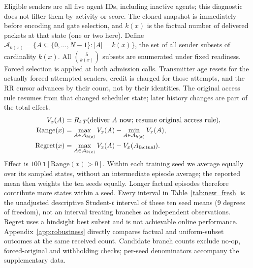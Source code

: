 \documentclass[10pt]{article}
\begin{document}
Eligible senders are all five agent IDs, including inactive agents; this diagnostic does not filter them by activity or score. The cloned snapshot is immediately before encoding and gate selection, and $k(x)$ is the factual number of delivered packets at that state (one or two here). Define $\mathcal A_{k(x)}=\{A\subseteq\{0,\ldots,N-1\}:|A|=k(x)\}$, the set of all sender subsets of cardinality $k(x)$. All $\binom{5}{k(x)}$ subsets are enumerated under fixed readiness. Forced selection is applied at both admission calls. Transmitter age resets for the actually forced attempted senders, credit is charged for those attempts, and the RR cursor advances by their count, not by their identities. The original access rule resumes from that changed scheduler state; later history changes are part of the total effect.
\begin{align}
 V_x(A)&=R_{t:T}(\text{deliver }A\text{ now; resume original access rule}),\\
 \mathrm{Range}(x)&=\max_{A\in\mathcal A_{k(x)}}V_x(A)-\min_{A\in\mathcal A_{k(x)}}V_x(A),\\
 \mathrm{Regret}(x)&=\max_{A\in\mathcal A_{k(x)}}V_x(A)-V_x(A_{\rm factual}).
\end{align}
Effect is $100\,\mathbf1[\mathrm{Range}(x)>0]$. Within each training seed we average equally over its sampled states, without an intermediate episode average; the reported mean then weights the ten seeds equally. Longer factual episodes therefore contribute more states within a seed. Every interval in Table~\ref{tab:new_fresh} is the unadjusted descriptive Student-$t$ interval of these ten seed means (9 degrees of freedom), not an interval treating branches as independent observations. Regret uses a hindsight best subset and is not achievable online performance. Appendix~\ref{app:robustness} directly compares factual and uniform-subset outcomes at the same received count. Candidate branch counts exclude no-op, forced-original and withholding checks; per-seed denominators accompany the supplementary data.
\end{document}
